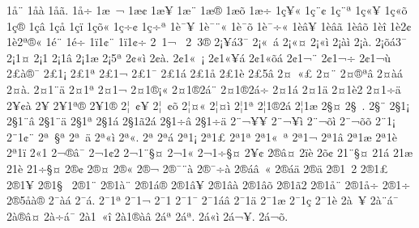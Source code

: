 {1^^e5^^a8
1^^e5^^e0
1^^e5^^e3.
1^^e5^^f7
1^^e6^^a0^^ac
1^^e6^^a2
1^^e6^^a5
1^^e6^^a8
1^^e6^^ae
1^^e6^^f5
1^^e6^^f7
1^^e7^^a5^^ab
1^^e7^^a8^^a2
1^^e7^^a8^^aa
1^^e7^^ab^^a5
1^^e7^^ab^^f5
1^^e7^^ae
1^^e7^^e2
1^^e7^^e5
1^^e7^^ef
1^^e7^^f5^^ab
1^^e7^^f7^^a2
1^^e7^^f7^^aa
1^^e8^^af^^a5
1^^e8^^af^^a8^^ab
1^^e8^^af^^f5
1^^e8^^af^^f7^^ab
1^^e8^^e2^^a5
1^^e8^^e2^^e3
1^^e8^^e2^^f5
1^^e8^^ee
1^^e82^^a2
1^^e82^^aa^^ae^^ab
1^^e9^^a8
1^^e9^^f7
1^^ef1^^a2^^a8
1^^ef1^^a2^^f7
2^^a01^^ac^^a0
2^^a03^^ae
2^^a1^^a5^^e13^^af
2^^a1^^ab^^a0^^e1
2^^a1^^ab^^a4
2^^a1^^ab^^ec
2^^a1^^e0^^ec
2^^a1^^e0.
2^^a1^^f5^^e13^^af
2^^a11^^a4
2^^a11^^ad
2^^a11^^e2
2^^a11^^e6
2^^a15^^aa
2^^a2^^ab^^ec
2^^a2^^e0.
2^^a21^^ab^^a0^^a1
2^^a21^^ab^^a5^^e1
2^^a21^^ab^^f5^^e1
2^^a21^^ac^^a8
2^^a21^^ac^^f7
2^^a21^^ac^^f9
2^^a3^^e0^^ae^^af
2^^a31^^a1
2^^a31^^aa
2^^a31^^ac
2^^a31^^af
2^^a31^^e1
2^^a31^^e5
2^^a31^^e8
2^^a35^^e2
2^^a4^^a0^^ab^^a3
2^^a4^^ad^^a8
2^^a4^^ae^^aa^^e2
2^^a4^^e0^^e1
2^^a4^^e0.
2^^a41^^a8^^ad^^e4
2^^a41^^aa
2^^a41^^ac
2^^a41^^ae^^a1^^ab
2^^a41^^ae2^^e1^^a8
2^^a41^^ae2^^e1^^f7
2^^a41^^e1
2^^a41^^e4
2^^a41^^e82
2^^a41^^f7^^ad^^e4
2^^a5^^a2^^e0
2^^a5^^ad
2^^a51^^aa^^ae
2^^a51^^ae
2^^a6^^a0^^a2^^a5
2^^a6^^a0^^a2^^f5
2^^a6^^a4^^ab
2^^a6^^a4^^ec
2^^a61^^aa
2^^a61^^ae2^^e1
2^^a61^^e6
2^^a7^^a4^^ad
2^^a7^^ad^^a0.
2^^a7^^ad^^a8
2^^a71^^a1
2^^a71^^a8^^ad^^e2
2^^a71^^a8^^ad^^e4
2^^a71^^aa
2^^a71^^e1
2^^a71^^e32^^e1
2^^a71^^f7^^ad^^e2
2^^a71^^f7^^ad^^e4
2^^a8^^ac^^a5^^ad^^a5
2^^a8^^ac^^a5^^ad^^ec
2^^a8^^ac^^f5^^ad^^ec
2^^a8^^ac^^f5^^ad^^f5
2^^a81^^a1
2^^a81^^a2^^a8
2^^aa^^a0^^a7^^aa
2^^aa^^a0^^e4
2^^aa^^ab^^ec
2^^aa^^ab.
2^^aa^^ad
2^^aa^^e1
2^^aa1^^a1
2^^aa1^^a3
2^^aa1^^aa
2^^aa1^^ab^^a0^^aa
2^^aa1^^ac
2^^aa1^^e2
2^^aa1^^e6
2^^aa1^^e8
2^^aa1^^ef
2^^ab1^^ad
2^^ac^^ae^^e2^^af
2^^ac1^^a22
2^^ac1^^a8^^a7^^a4
2^^ac1^^ab
2^^ac1^^f7^^a7^^a4
2^^ad^^a5^^a2^^ad
2^^ad^^ae^^e2^^a4
2^^ad^^ef^^e8
2^^ad^^f5^^a2^^ad
2^^ad1^^a8^^a7^^a4
2^^ad1^^e1
2^^ad1^^e6
2^^ad1^^e8
2^^ad1^^f7^^a7^^a4
2^^ae^^a2
2^^ae^^a4
2^^ae^^ab
2^^ae^^ac
2^^ae^^af^^a8^^e0
2^^ae^^af^^f7^^e0
2^^ae^^e1^^e2^^a0^^ab
2^^ae^^e1^^e4
2^^ae^^e4
2^^ae1^^a02
2^^ae1^^a3
2^^ae1^^a5
2^^ae1^^a7^^a0
2^^ae1^^a8
2^^ae1^^e0^^a8
2^^ae1^^e1^^ae
2^^ae1^^e2^^a5
2^^ae1^^e2^^e0
2^^ae1^^e2^^f5
2^^ae1^^e32
2^^ae1^^e5^^a8
2^^ae1^^e5^^f7
2^^ae1^^f7
2^^ae5^^e5^^e0^^ae
2^^af^^e0^^e1
2^^af^^e1.
2^^af1^^aa
2^^af1^^ac
2^^af1^^ad
2^^af1^^af
2^^af1^^e1^^e2
2^^af1^^e4
2^^af1^^e6
2^^af1^^e7
2^^af1^^e8
2^^e0^^a0^^a5
2^^e0^^a8^^e1^^af
2^^e0^^ae^^e2^^a4
2^^e0^^f7^^e1^^af
2^^e01^^a0^^ab^^ee
2^^e01^^ae^^e0^^e2
2^^e1^^aa^^ad
2^^e1^^aa.
2^^e1^^ab^^ec
2^^e1^^ac^^a5^^ad.
2^^e1^^ac^^f5^^ad.
}
